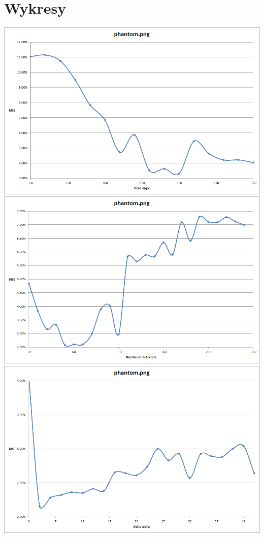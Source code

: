 \documentclass[a4paper,11pt]{article}
\begin{document}
\section{Wykresy}
\includegraphics[width=\textwidth]{phantomDeadAngle}
\includegraphics[width=\textwidth]{phantomDetectors}
\includegraphics[width=\textwidth]{phantomAlpha}
\end{document}
